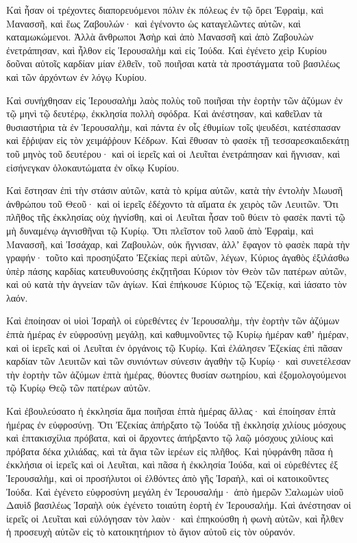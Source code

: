{\par }{\PP {}Καὶ ἦσαν οἱ τρέχοντες διαπορευόμενοι πόλιν ἐκ πόλεως ἐν τῷ ὄρει Ἐφραὶμ, καὶ Μανασσῆ, καὶ ἕως Ζαβουλών· καὶ ἐγένοντο ὡς καταγελῶντες αὐτῶν, καὶ καταμωκώμενοι.
Ἀλλὰ ἄνθρωποι Ἀσὴρ καὶ ἀπὸ Μανασσῆ καὶ ἀπὸ Ζαβουλὼν ἐνετράπησαν, καὶ ἦλθον εἰς Ἱερουσαλὴμ καὶ εἰς Ἰούδα.
Καὶ ἐγένετο χεὶρ Κυρίου δοῦναι αὐτοῖς καρδίαν μίαν ἐλθεῖν, τοῦ ποιῆσαι κατὰ τὰ προστάγματα τοῦ βασιλέως καὶ τῶν ἀρχόντων ἐν λόγῳ Κυρίου.
\par }{\PP {}Καὶ συνήχθησαν εἰς Ἱερουσαλὴμ λαὸς πολὺς τοῦ ποιῆσαι τὴν ἑορτὴν τῶν ἀζύμων ἐν τῷ μηνὶ τῷ δευτέρῳ, ἐκκλησία πολλὴ σφόδρα.
Καὶ ἀνέστησαν, καὶ καθεῖλαν τὰ θυσιαστήρια τὰ ἐν Ἱερουσαλὴμ, καὶ πάντα ἐν οἷς ἐθυμίων τοῖς ψευδέσι, κατέσπασαν καὶ ἔῤῥιψαν εἰς τὸν χειμάῤῥουν Κέδρων.
Καὶ ἔθυσαν τὸ φασὲκ τῇ τεσσαρεσκαιδεκάτῃ τοῦ μηνὸς τοῦ δευτέρου· καὶ οἱ ἱερεῖς καὶ οἱ Λευῖται ἐνετράπησαν καὶ ἥγνισαν, καὶ εἰσήνεγκαν ὁλοκαυτώματα ἐν οἴκῳ Κυρίου.
\par }{\PP {}Καὶ ἔστησαν ἐπὶ τὴν στάσιν αὐτῶν, κατὰ τὸ κρίμα αὐτῶν, κατὰ τὴν ἐντολὴν Μωυσῆ ἀνθρώπου τοῦ Θεοῦ· καὶ οἱ ἱερεῖς ἐδέχοντο τὰ αἵματα ἐκ χειρὸς τῶν Λευιτῶν.
Ὅτι πλῆθος τῆς ἐκκλησίας οὐχ ἡγνίσθη, καὶ οἱ Λευῖται ἦσαν τοῦ θύειν τὸ φασὲκ παντὶ τῷ μὴ δυναμένῳ ἁγνισθῆναι τῷ Κυρίῳ.
Ὅτι πλεῖστον τοῦ λαοῦ ἀπὸ Ἐφραὶμ, καὶ Μανασσῆ, καὶ Ἰσσάχαρ, καὶ Ζαβουλὼν, οὐκ ἥγνισαν, ἀλλʼ ἔφαγον τὸ φασὲκ παρὰ τὴν γραφήν· τοῦτο καὶ προσηύξατο Ἐζεκίας περὶ αὐτῶν, λέγων, Κύριος ἀγαθὸς ἐξιλάσθω ὑπὲρ
πάσης καρδίας κατευθυνούσης ἐκζητῆσαι Κύριον τὸν Θεὸν τῶν πατέρων αὐτῶν, καὶ οὐ κατὰ τὴν ἁγνείαν τῶν ἁγίων.
Καὶ ἐπήκουσε Κύριος τῷ Ἐζεκίᾳ, καὶ ἰάσατο τὸν λαόν.
\par }{\PP {}Καὶ ἐποίησαν οἱ υἱοὶ Ἰσραὴλ οἱ εὑρεθέντες ἐν Ἱερουσαλὴμ, τὴν ἑορτὴν τῶν ἀζύμων ἑπτὰ ἡμέρας ἐν εὐφροσύνῃ μεγάλῃ, καὶ καθυμνοῦντες τῷ Κυρίῳ ἡμέραν καθʼ ἡμέραν, καὶ οἱ ἱερεῖς καὶ οἱ Λευῖται ἐν ὀργάνοις τῷ Κυρίῳ.
Καὶ ἐλάλησεν Ἐζεκίας ἐπὶ πᾶσαν καρδίαν τῶν Λευιτῶν καὶ τῶν συνιόντων σύνεσιν ἀγαθὴν τῷ Κυρίῳ· καὶ συνετέλεσαν τὴν ἑορτὴν τῶν ἀζύμων ἑπτὰ ἡμέρας, θύοντες θυσίαν σωτηρίου, καὶ ἐξομολογούμενοι τῷ Κυρίῳ Θεῷ τῶν πατέρων αὐτῶν.
\par }{\PP {}Καὶ ἐβουλεύσατο ἡ ἐκκλησία ἅμα ποιῆσαι ἑπτὰ ἡμέρας ἄλλας· καὶ ἐποίησαν ἑπτὰ ἡμέρας ἐν εὐφροσύνῃ.
Ὅτι Ἐζεκίας ἀπήρξατο τῷ Ἰούδα τῇ ἐκκλησίᾳ χιλίους μόσχους καὶ ἑπτακισχίλια πρόβατα, καὶ οἱ ἄρχοντες ἀπήρξαντο τῷ λαῷ μόσχους χιλίους καὶ πρόβατα δέκα χιλιάδας, καὶ τὰ ἅγια τῶν ἱερέων εἰς πλῆθος.
Καὶ ηὐφράνθη πᾶσα ἡ ἐκκλήσια οἱ ἱερεῖς καὶ οἱ Λευῖται, καὶ πᾶσα ἡ ἐκκλησία Ἰούδα, καὶ οἱ εὑρεθέντες ἐξ Ἱερουσαλὴμ, καὶ οἱ προσήλυτοι οἱ ἐλθόντες ἀπὸ γῆς Ἰσραὴλ, καὶ οἱ κατοικοῦντες Ἰούδα.
Καὶ ἐγένετο εὐφροσύνη μεγάλη ἐν Ἱερουσαλήμ· ἀπὸ ἡμερῶν Σαλωμὼν υἱοῦ Δαυὶδ βασιλέως Ἰσραὴλ οὐκ ἐγένετο τοιαύτη ἑορτὴ ἐν Ἱερουσαλήμ.
Καὶ ἀνέστησαν οἱ ἱερεῖς οἱ Λευῖται καὶ εὐλόγησαν τὸν λαὸν· καὶ ἐπηκούσθη ἡ φωνὴ αὐτῶν, καὶ ἦλθεν ἡ προσευχὴ αὐτῶν εἰς τὸ κατοικητήριον τὸ ἅγιον αὐτοῦ εἰς τὸν οὐρανόν.

}
